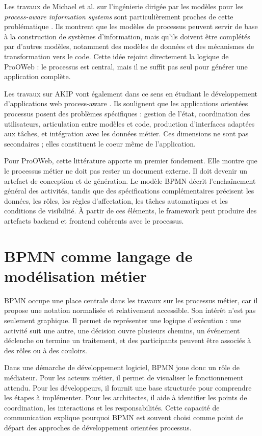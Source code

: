 \documentclass[12pt,a4paper]{article}
\begin{document}
Les travaux de Michael et al. sur l'ingénierie dirigée par les modèles pour les \textit{process-aware information systems} sont particulièrement proches de cette problématique \cite{michael2022}. Ils montrent que les modèles de processus peuvent servir de base à la construction de systèmes d'information, mais qu'ils doivent être complétés par d'autres modèles, notamment des modèles de données et des mécanismes de transformation vers le code. Cette idée rejoint directement la logique de ProOWeb : le processus est central, mais il ne suffit pas seul pour générer une application complète.

Les travaux sur AKIP vont également dans ce sens en étudiant le développement d'applications web process-aware \cite{neto2022}. Ils soulignent que les applications orientées processus posent des problèmes spécifiques : gestion de l'état, coordination des utilisateurs, articulation entre modèles et code, production d'interfaces adaptées aux tâches, et intégration avec les données métier. Ces dimensions ne sont pas secondaires ; elles constituent le coeur même de l'application.

Pour ProOWeb, cette littérature apporte un premier fondement. Elle montre que le processus métier ne doit pas rester un document externe. Il doit devenir un artefact de conception et de génération. Le modèle BPMN décrit l'enchaînement général des activités, tandis que des spécifications complémentaires précisent les données, les rôles, les règles d'affectation, les tâches automatiques et les conditions de visibilité. À partir de ces éléments, le framework peut produire des artefacts backend et frontend cohérents avec le processus.

\section{BPMN comme langage de modélisation métier}

BPMN occupe une place centrale dans les travaux sur les processus métier, car il propose une notation normalisée et relativement accessible. Son intérêt n'est pas seulement graphique. Il permet de représenter une logique d'exécution : une activité suit une autre, une décision ouvre plusieurs chemins, un événement déclenche ou termine un traitement, et des participants peuvent être associés à des rôles ou à des couloirs.

Dans une démarche de développement logiciel, BPMN joue donc un rôle de médiateur. Pour les acteurs métier, il permet de visualiser le fonctionnement attendu. Pour les développeurs, il fournit une base structurée pour comprendre les étapes à implémenter. Pour les architectes, il aide à identifier les points de coordination, les interactions et les responsabilités. Cette capacité de communication explique pourquoi BPMN est souvent choisi comme point de départ des approches de développement orientées processus.
\end{document}
